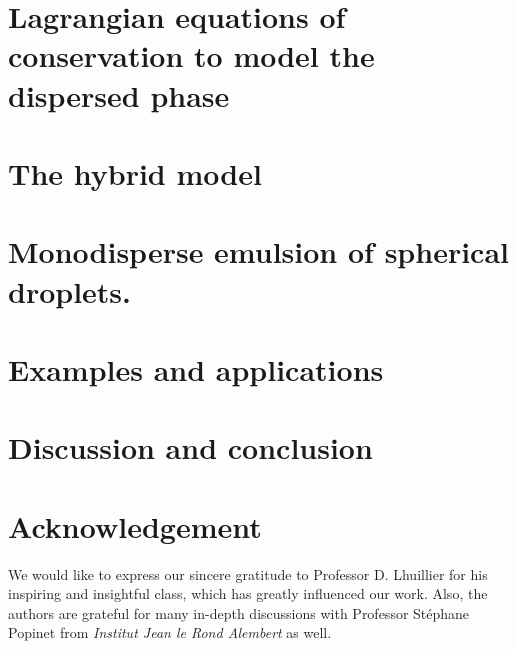 \documentclass[12pt]{My_preprint}
\begin{document}
\section{Lagrangian equations of conservation to model the dispersed phase}
\label{sec:Lagrangian}


\section{The hybrid model}
\label{sec:averaged_eq}






\section{Monodisperse emulsion of spherical droplets.}
\label{sec:Exemples}
 



% 
% 
\section{Examples and applications}

% 



\section{Discussion and conclusion}


\section*{Acknowledgement}
We would like to express our sincere gratitude to Professor D. Lhuillier for his inspiring and insightful class, which has greatly influenced our work.
Also, the authors are grateful for many in-depth discussions with Professor St\'ephane Popinet from \textit{Institut Jean le Rond Alembert} as well. 




\appendix





\end{document}
